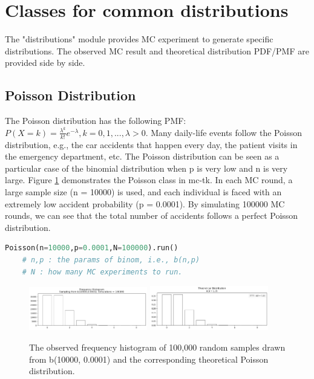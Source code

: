 \documentclass[11pt, letterpaper]{article}
\begin{document}
\section{Classes for common distributions}
The "distributions" module provides MC experiment to generate specific distributions.
The observed MC result and theoretical distribution PDF/PMF are provided side by side.

\subsection{Poisson Distribution}
The Poisson distribution has the following PMF:$P(X=k)=\frac{\lambda^k}{k!}e^{-\lambda},k=0,1,...,\lambda>0$.
Many daily-life events follow the Poisson distribution, e.g., the car accidents that happen every day,
the patient visits in the emergency department, etc. The Poisson distribution can be seen as a particular
case of the binomial distribution when p is very low and n is very large. Figure \ref{fig:possion mc} demonstrates the
Poisson class in mc-tk. In each MC round, a large sample size (n = 10000) is used, and each individual
is faced with an extremely low accident probability (p = 0.0001). By simulating 100000 MC rounds, we can see
that the total number of accidents follows a perfect Poisson distribution.

\lstset{
    basicstyle=\footnotesize,
    xleftmargin=-1em,aboveskip=0.5em,belowskip=0.5em
}
\begin{lstlisting}[language=python]
    Poisson(n=10000,p=0.0001,N=100000).run()
    # n,p : the params of binom, i.e., b(n,p)
    # N : how many MC experiments to run.
    \end{lstlisting}

\begin{figure}[htbp]
    \centering
    \includegraphics[width=0.46\textwidth]{fig5-poisson mc1.png}
    \includegraphics[width=0.46\textwidth]{fig5-poisson mc2.png}
    \caption{The observed frequency histogram of 100,000 random samples drawn from b(10000, 0.0001) and the corresponding theoretical Poisson distribution.}
    \label{fig:possion mc}
\end{figure}
\end{document}
